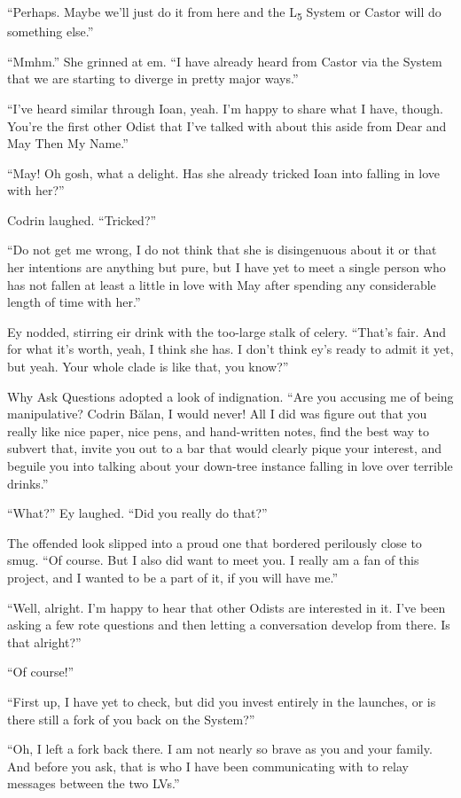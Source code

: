 ``Perhaps. Maybe we'll just do it from here and the L\textsubscript{5} System or Castor will do something else.''

``Mmhm.'' She grinned at em. ``I have already heard from Castor via the System that we are starting to diverge in pretty major ways.''

``I've heard similar through Ioan, yeah. I'm happy to share what I have, though. You're the first other Odist that I've talked with about this aside from Dear and May Then My Name.''

``May! Oh gosh, what a delight. Has she already tricked Ioan into falling in love with her?''

Codrin laughed. ``Tricked?''

``Do not get me wrong, I do not think that she is disingenuous about it or that her intentions are anything but pure, but I have yet to meet a single person who has not fallen at least a little in love with May after spending any considerable length of time with her.''

Ey nodded, stirring eir drink with the too-large stalk of celery. ``That's fair. And for what it's worth, yeah, I think she has. I don't think ey's ready to admit it yet, but yeah. Your whole clade is like that, you know?''

Why Ask Questions adopted a look of indignation. ``Are you accusing me of being manipulative? Codrin Bălan, I would never! All I did was figure out that you really like nice paper, nice pens, and hand-written notes, find the best way to subvert that, invite you out to a bar that would clearly pique your interest, and beguile you into talking about your down-tree instance falling in love over terrible drinks.''

``What?'' Ey laughed. ``Did you really do that?''

The offended look slipped into a proud one that bordered perilously close to smug. ``Of course. But I also did want to meet you. I really am a fan of this project, and I wanted to be a part of it, if you will have me.''

``Well, alright. I'm happy to hear that other Odists are interested in it. I've been asking a few rote questions and then letting a conversation develop from there. Is that alright?''

``Of course!''

``First up, I have yet to check, but did you invest entirely in the launches, or is there still a fork of you back on the System?''

``Oh, I left a fork back there. I am not nearly so brave as you and your family. And before you ask, that is who I have been communicating with to relay messages between the two LVs.''

